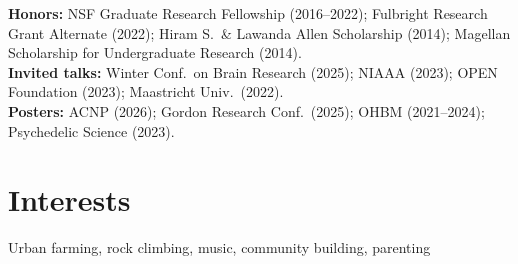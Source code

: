 \documentclass[10pt, letterpaper]{article}
\begin{document}
{\small
\textbf{Honors:} NSF Graduate Research Fellowship (2016--2022); Fulbright Research Grant Alternate (2022); Hiram S.\ \& Lawanda Allen Scholarship (2014); Magellan Scholarship for Undergraduate Research (2014). \\[0.15em]
\textbf{Invited talks:} Winter Conf.\ on Brain Research (2025); NIAAA (2023); OPEN Foundation (2023); Maastricht Univ.\ (2022). \\[0.15em]
\textbf{Posters:} ACNP (2026); Gordon Research Conf.\ (2025); OHBM (2021--2024); Psychedelic Science (2023).
}

\section{Interests}

{\small Urban farming, rock climbing, music, community building, parenting}
\end{document}
